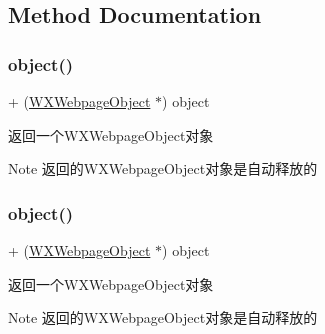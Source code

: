 \subsection{Method Documentation}
\mbox{\label{interface_w_x_webpage_object_a50b9c0ac9ab53b0ebf0038846d6f0baa}} 
\subsubsection{\texorpdfstring{object()}{object()}\hspace{0.1cm}{\footnotesize\ttfamily [1/3]}}
{\footnotesize\ttfamily + (\mbox{\hyperlink{interface_w_x_webpage_object}{W\+X\+Webpage\+Object}} $\ast$) object \begin{DoxyParamCaption}{ }\end{DoxyParamCaption}}



返回一个\+W\+X\+Webpage\+Object对象 

\begin{DoxyNote}{Note}
返回的\+W\+X\+Webpage\+Object对象是自动释放的 
\end{DoxyNote}
\mbox{\label{interface_w_x_webpage_object_a50b9c0ac9ab53b0ebf0038846d6f0baa}} 
\subsubsection{\texorpdfstring{object()}{object()}\hspace{0.1cm}{\footnotesize\ttfamily [2/3]}}
{\footnotesize\ttfamily + (\mbox{\hyperlink{interface_w_x_webpage_object}{W\+X\+Webpage\+Object}} $\ast$) object \begin{DoxyParamCaption}{ }\end{DoxyParamCaption}}



返回一个\+W\+X\+Webpage\+Object对象 

\begin{DoxyNote}{Note}
返回的\+W\+X\+Webpage\+Object对象是自动释放的 
\end{DoxyNote}
\mbox{\label{interface_w_x_webpage_object_a50b9c0ac9ab53b0ebf0038846d6f0baa}} 
